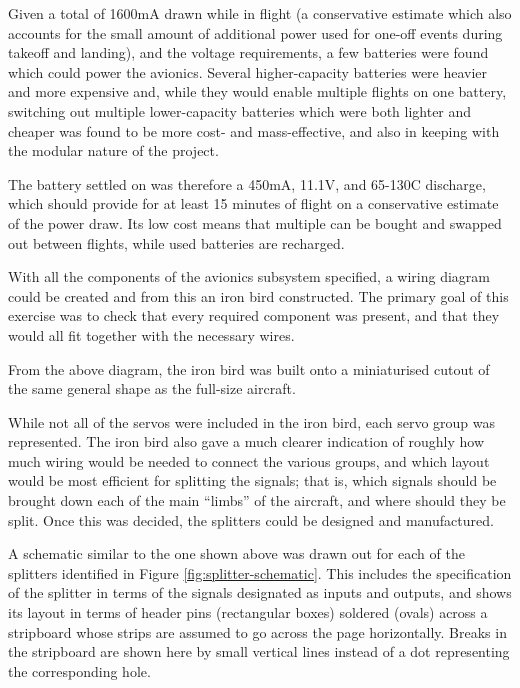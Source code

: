 \documentclass[../../main.tex]{subfiles}
\begin{document}
Given a total of 1600mA drawn while in flight (a conservative estimate which also accounts for the small amount of additional power used for one-off events during takeoff and landing), and the voltage requirements, a few batteries were found which could power the avionics.
Several higher-capacity batteries were heavier and more expensive and, while they would enable multiple flights on one battery, switching out multiple lower-capacity batteries which were both lighter and cheaper was found to be more cost- and mass-effective, and also in keeping with the modular nature of the project. 

The battery settled on was therefore a 450mA, 11.1V, and 65-130C discharge, which should provide for at least 15 minutes of flight on a conservative estimate of the power draw.
Its low cost means that multiple can be bought and swapped out between flights, while used batteries are recharged. 

With all the components of the avionics subsystem specified, a wiring diagram could be created and from this an iron bird constructed.
The primary goal of this exercise was to check that every required component was present, and that they would all fit together with the necessary wires. 


From the above diagram, the iron bird was built onto a miniaturised cutout of the same general shape as the full-size aircraft. 


While not all of the servos were included in the iron bird, each servo group was represented.
The iron bird also gave a much clearer indication of roughly how much wiring would be needed to connect the various groups, and which layout would be most efficient for splitting the signals; that is, which signals should be brought down each of the main “limbs” of the aircraft, and where should they be split.
Once this was decided, the splitters could be designed and manufactured. 


A schematic similar to the one shown above was drawn out for each of the splitters identified in Figure \ref{fig:splitter-schematic}.
This includes the specification of the splitter in terms of the signals designated as inputs and outputs, and shows its layout in terms of header pins (rectangular boxes) soldered (ovals) across a stripboard whose strips are assumed to go across the page horizontally.
Breaks in the stripboard are shown here by small vertical lines instead of a dot representing the corresponding hole. 
\end{document}
